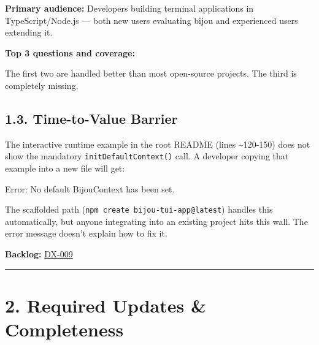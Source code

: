 \textbf{Primary audience:} Developers building terminal applications in TypeScript/Node.js --- both new users evaluating bijou and experienced users extending it.

\textbf{Top 3 questions and coverage:}



The first two are handled better than most open-source projects. The third is completely missing.

\subsection{1.3. Time-to-Value Barrier}\label{record-412-time-to-value-barrier}

The interactive runtime example in the root README (lines \textasciitilde120-150) does not show the mandatory \texttt{i\allowbreak{}n\allowbreak{}i\allowbreak{}t\allowbreak{}D\allowbreak{}e\allowbreak{}f\allowbreak{}a\allowbreak{}u\allowbreak{}l\allowbreak{}t\allowbreak{}C\allowbreak{}o\allowbreak{}n\allowbreak{}t\allowbreak{}e\allowbreak{}x\allowbreak{}t\allowbreak{}(\allowbreak{})} call. A developer copying that example into a new file will get:

\begin{CodeBlock}
Error: No default BijouContext has been set.
\end{CodeBlock}

The scaffolded path (\texttt{n\allowbreak{}p\allowbreak{}m\allowbreak{} \allowbreak{}c\allowbreak{}r\allowbreak{}e\allowbreak{}a\allowbreak{}t\allowbreak{}e\allowbreak{} \allowbreak{}b\allowbreak{}i\allowbreak{}j\allowbreak{}o\allowbreak{}u\allowbreak{}-\allowbreak{}t\allowbreak{}u\allowbreak{}i\allowbreak{}-\allowbreak{}a\allowbreak{}p\allowbreak{}p\allowbreak{}@\allowbreak{}l\allowbreak{}a\allowbreak{}t\allowbreak{}e\allowbreak{}s\allowbreak{}t}) handles this automatically, but anyone integrating into an existing project hits this wall. The error message doesn't explain how to fix it.

\textbf{Backlog:} \href{https://github.com/flyingrobots/bijou/blob/cbd70612140e7a450d764b3c7be1c6af878b99bc/docs/method/graveyard/legacy-backlog/inbox/DX-009-context-auto-init-and-error-messages.md}{DX-009}

\begin{center}\rule{0.5\linewidth}{0.5pt}\end{center}

\section{2. Required Updates \& Completeness}\label{record-412-required-updates-completeness}

